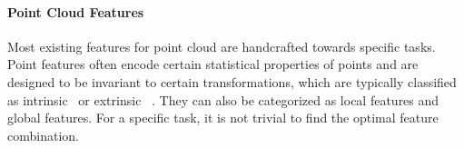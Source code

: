 \paragraph{Point Cloud Features}
Most existing features for point cloud are handcrafted towards specific tasks. Point features often encode certain statistical properties of points and are designed to be invariant to certain transformations, which are typically classified as intrinsic~\cite{aubry2011wave, sun2009concise, bronstein2010scale} or extrinsic ~\cite{rusu2008aligning, rusu2009fast, ling2007shape, johnson1999using, chen2003visual}.  They can also be categorized as local features and global features. For a specific task, it is not trivial to find the optimal feature combination.






